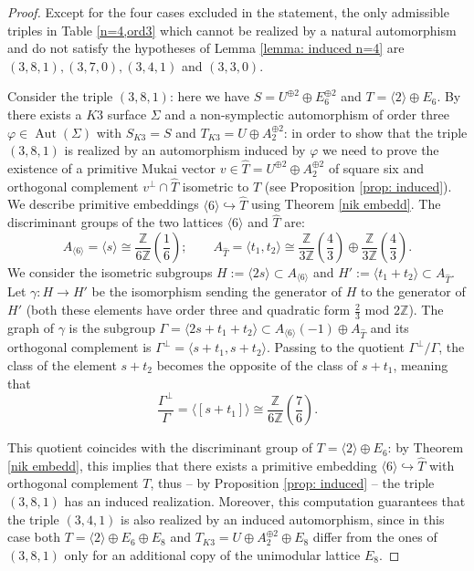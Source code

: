 \documentclass{amsart}
\theoremstyle{definition}
\newcommand{\ra}{\rightarrow}
\newcommand{\IZ}{\mathbb{Z}}
\newcommand{\coloneqq}{:=}
\DeclareMathOperator{\aut}{Aut}
\begin{document}
\begin{proof}
Except for the four cases excluded in the statement, the only admissible triples in Table \ref{n=4,ord3} which cannot be realized by a natural automorphism and do not satisfy the hypotheses of Lemma \ref{lemma: induced n=4} are $(3,8,1), (3,7,0), (3,4,1)$ and $(3,3,0)$.

Consider the triple $(3,8,1)$: here we have $S=U^{\oplus 2} \oplus E_6^{\oplus 2}$ and $T = \langle 2 \rangle \oplus E_6$. By \cite[Theorem 3.3]{autom_k3_ord3} there exists a $K3$ surface $\Sigma$ and a non-symplectic automorphism of order three $\varphi \in \aut(\Sigma)$ with $S_{K3} = S$ and $T_{K3} = U \oplus A_2^{\oplus 2}$: in order to show that the triple $(3,8,1)$ is realized by an automorphism induced by $\varphi$ we need to prove the existence of a primitive Mukai vector $v \in \hat{T} = U^{\oplus 2} \oplus A_2^{\oplus 2}$ of square six and orthogonal complement $v^\perp \cap \hat{T}$ isometric to $T$ (see Proposition \ref{prop: induced}). We describe primitive embeddings $\langle 6 \rangle \hookrightarrow \hat{T}$ using Theorem \ref{nik embedd}. The discriminant groups of the two lattices $\langle 6 \rangle$ and $\hat{T}$ are:
\[ A_{\langle 6 \rangle} = \langle s \rangle \cong \frac{\IZ}{6 \IZ}\left( \frac{1}{6}\right); \qquad A_{\hat{T}} = \langle t_1, t_2 \rangle \cong \frac{\IZ}{3 \IZ}\left( \frac{4}{3}\right) \oplus \frac{\IZ}{3 \IZ}\left( \frac{4}{3}\right).\]
We consider the isometric subgroups $H \coloneqq \langle 2s \rangle \subset A_{\langle 6 \rangle}$ and $H' \coloneqq \langle t_1 + t_2 \rangle \subset A_{\hat{T}}$. Let $\gamma: H \ra H'$ be the isomorphism sending the generator of $H$ to the generator of $H'$ (both these elements have order three and quadratic form $\frac{2}{3}$ mod $2\IZ$). The graph of $\gamma$ is the subgroup $\Gamma = \langle 2s + t_1 + t_2 \rangle \subset A_{\langle 6 \rangle} (-1) \oplus  A_{\hat{T}} $ and its orthogonal complement is $\Gamma^\perp = \langle s+t_1, s+ t_2\rangle$. Passing to the quotient $\Gamma^{\perp}/\Gamma$, the class of the element $s + t_2$ becomes the opposite of the class of $s + t_1$, meaning that
\[ \frac{\Gamma^{\perp}}{\Gamma} = \langle [s+t_1] \rangle \cong \frac{\IZ}{6 \IZ} \left(\frac{7}{6} \right).\]

This quotient coincides with the discriminant group of $T = \langle 2 \rangle \oplus E_6$: by Theorem \ref{nik embedd}, this implies that there exists a primitive embedding $\langle 6 \rangle \hookrightarrow \hat{T}$ with orthogonal complement $T$, thus -- by Proposition \ref{prop: induced} -- the triple $(3,8,1)$ has an induced realization. Moreover, this computation guarantees that the triple $(3,4,1)$ is also realized by an induced automorphism, since in this case both $T = \langle 2 \rangle \oplus E_6 \oplus E_8$ and $T_{K3} =  U \oplus A_2^{\oplus 2} \oplus E_8$ differ from the ones of $(3,8,1)$ only for an additional copy of the unimodular lattice $E_8$.


\end{proof}
\end{document}
